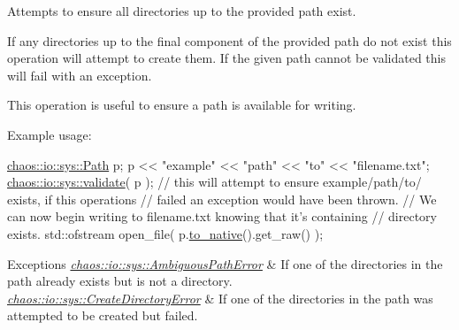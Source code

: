 Attempts to ensure all directories up to the provided path exist. 

If any directories up to the final component of the provided path do not exist this operation will attempt to create them. If the given path cannot be validated this will fail with an exception.

This operation is useful to ensure a path is available for writing.

Example usage\+:


\begin{DoxyCode}
\hyperlink{classchaos_1_1io_1_1sys_1_1_path}{chaos::io::sys::Path} p;
p << \textcolor{stringliteral}{"example"} << \textcolor{stringliteral}{"path"} << \textcolor{stringliteral}{"to"} << \textcolor{stringliteral}{"filename.txt"};
\hyperlink{namespacechaos_1_1io_1_1sys_a15e20b105c40cf4d73b13afe87ce1781}{chaos::io::sys::validate}( p );
\textcolor{comment}{// this will attempt to ensure example/path/to/ exists, if this operations}
\textcolor{comment}{// failed an exception would have been thrown.}
\textcolor{comment}{// We can now begin writing to filename.txt knowing that it's containing}
\textcolor{comment}{// directory exists.}
std::ofstream open\_file( p.\hyperlink{classchaos_1_1io_1_1sys_1_1_path_a9528370d2e3ab277a7e71a93469bbc45}{to\_native}().get\_raw() );
\end{DoxyCode}



\begin{DoxyExceptions}{Exceptions}
{\em \hyperlink{classchaos_1_1io_1_1sys_1_1_ambiguous_path_error}{chaos\+::io\+::sys\+::\+Ambiguous\+Path\+Error}} & If one of the directories in the path already exists but is not a directory. \\
\hline
{\em \hyperlink{classchaos_1_1io_1_1sys_1_1_create_directory_error}{chaos\+::io\+::sys\+::\+Create\+Directory\+Error}} & If one of the directories in the path was attempted to be created but failed. \\
\hline
\end{DoxyExceptions}
